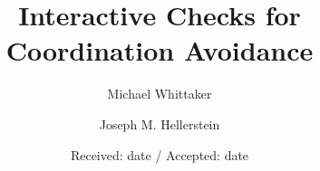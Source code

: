 \documentclass[twocolumn]{svjour3}
\begin{document}
  \title{Interactive Checks for Coordination Avoidance}

  \author{Michael Whittaker \and Joseph M. Hellerstein}


  \date{Received: date / Accepted: date}

  \maketitle
  {}

  {}
  {}
  {}
  {}
  {}
  {}
  {}
  {}
  {}

  
  
\end{document}
